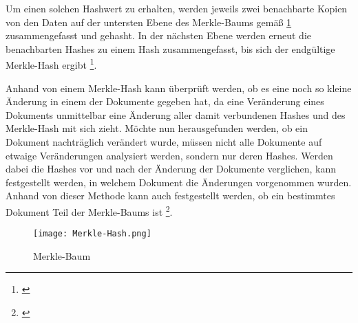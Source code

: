 Um einen solchen Hashwert zu erhalten, werden jeweils zwei benachbarte Kopien von den Daten auf der untersten Ebene des Merkle-Baums gemäß \cref{fig:Merkle-Baum} zusammengefasst und gehasht. In der nächsten Ebene werden erneut die benachbarten Hashes zu einem Hash zusammengefasst, bis sich der endgültige Merkle-Hash ergibt \footnote{\parencite[vgl.][S. 8f]{Fill.2020}}.

Anhand von einem Merkle-Hash kann überprüft werden, ob es eine noch so kleine Änderung in einem der Dokumente gegeben hat, da eine Veränderung eines Dokuments unmittelbar eine Änderung aller damit verbundenen Hashes und des Merkle-Hash mit sich zieht. Möchte nun herausgefunden werden, ob ein Dokument nachträglich verändert wurde, müssen nicht alle Dokumente auf etwaige Veränderungen analysiert werden, sondern nur deren Hashes. Werden dabei die Hashes vor und nach der Änderung der Dokumente verglichen, kann festgestellt werden, in welchem Dokument die Änderungen vorgenommen wurden. Anhand von dieser Methode kann auch festgestellt werden, ob ein bestimmtes Dokument Teil der Merkle-Baums ist \footnote{\parencite[vgl.][S. 9ff]{Fill.2020}}.


\begin{figure}[h]
    \begin{centering}
        \texttt{[image: Merkle-Hash.png]}
        \caption[Merkle-Baum]{Merkle-Baum \footnotemark}
        \label{fig:Merkle-Baum}
    \end{centering}
\end{figure}




